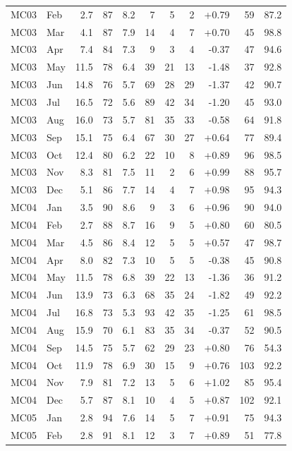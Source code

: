 \begin{longtable}{llrrrrrrrrr}
MC03 & Feb & 2.7 & 87 & 8.2 & 7 & 5 & 2 & +0.79 & 59 & 87.2 \\
MC03 & Mar & 4.1 & 87 & 7.9 & 14 & 4 & 7 & +0.70 & 45 & 98.8 \\
MC03 & Apr & 7.4 & 84 & 7.3 & 9 & 3 & 4 & -0.37 & 47 & 94.6 \\
MC03 & May & 11.5 & 78 & 6.4 & 39 & 21 & 13 & -1.48 & 37 & 92.8 \\
MC03 & Jun & 14.8 & 76 & 5.7 & 69 & 28 & 29 & -1.37 & 42 & 90.7 \\
MC03 & Jul & 16.5 & 72 & 5.6 & 89 & 42 & 34 & -1.20 & 45 & 93.0 \\
MC03 & Aug & 16.0 & 73 & 5.7 & 81 & 35 & 33 & -0.58 & 64 & 91.8 \\
MC03 & Sep & 15.1 & 75 & 6.4 & 67 & 30 & 27 & +0.64 & 77 & 89.4 \\
MC03 & Oct & 12.4 & 80 & 6.2 & 22 & 10 & 8 & +0.89 & 96 & 98.5 \\
MC03 & Nov & 8.3 & 81 & 7.5 & 11 & 2 & 6 & +0.99 & 88 & 95.7 \\
MC03 & Dec & 5.1 & 86 & 7.7 & 14 & 4 & 7 & +0.98 & 95 & 94.3 \\
\midrule
MC04 & Jan & 3.5 & 90 & 8.6 & 9 & 3 & 6 & +0.96 & 90 & 94.0 \\
MC04 & Feb & 2.7 & 88 & 8.7 & 16 & 9 & 5 & +0.80 & 60 & 80.5 \\
MC04 & Mar & 4.5 & 86 & 8.4 & 12 & 5 & 5 & +0.57 & 47 & 98.7 \\
MC04 & Apr & 8.0 & 82 & 7.3 & 10 & 5 & 5 & -0.38 & 45 & 90.8 \\
MC04 & May & 11.5 & 78 & 6.8 & 39 & 22 & 13 & -1.36 & 36 & 91.2 \\
MC04 & Jun & 13.9 & 73 & 6.3 & 68 & 35 & 24 & -1.82 & 49 & 92.2 \\
MC04 & Jul & 16.8 & 73 & 5.3 & 93 & 42 & 35 & -1.25 & 61 & 98.5 \\
MC04 & Aug & 15.9 & 70 & 6.1 & 83 & 35 & 34 & -0.37 & 52 & 90.5 \\
MC04 & Sep & 14.5 & 75 & 5.7 & 62 & 29 & 23 & +0.80 & 76 & 54.3 \\
MC04 & Oct & 11.9 & 78 & 6.9 & 30 & 15 & 9 & +0.76 & 103 & 92.2 \\
MC04 & Nov & 7.9 & 81 & 7.2 & 13 & 5 & 6 & +1.02 & 85 & 95.4 \\
MC04 & Dec & 5.7 & 87 & 8.1 & 10 & 4 & 5 & +0.87 & 102 & 92.1 \\
\midrule
MC05 & Jan & 2.8 & 94 & 7.6 & 14 & 5 & 7 & +0.91 & 75 & 94.3 \\
MC05 & Feb & 2.8 & 91 & 8.1 & 12 & 3 & 7 & +0.89 & 51 & 77.8 \\

\end{longtable}
